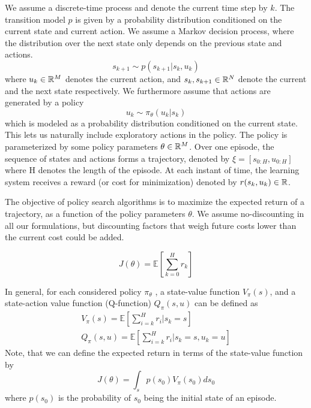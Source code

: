 We assume a discrete-time process and denote the
current time step by $k$. The transition model $p$ is given by a probability distribution conditioned on the current state and current action. We assume a Markov decision process, where the distribution over the next state only depends on the previous state and actions.
\begin{equation}
    s_{k+1} \sim p(s_{k+1}|s_k,u_k)
\end{equation}
where $u_k \in \mathbb R^M$ denotes the current action, and $s_k, s_{k+1} \in \mathbb R^N$
denote the current and the next state respectively. We furthermore
assume that actions are generated by a policy
\begin{equation}
    u_k \sim \pi_{\theta}(u_k|s_k)
\end{equation}
which is modeled as a probability distribution conditioned on the current state. This lets us naturally include exploratory actions in the policy. The policy is parameterized by some policy parameters $\theta \in \mathbb R^M$. Over one episode, the sequence of states and actions forms a trajectory, denoted by $\xi = [s_{0:H}, u_{0:H}]$ where H
denotes the length of the episode. At each instant of time,
the learning system receives a reward (or cost for minimization) denoted by $r(s_k, u_k) \in \mathbb R$.

The objective of policy search algorithms is to maximize the expected return of a trajectory, as a function of the policy parameters $\theta$. We assume no-discounting in all our formulations, but discounting factors that weigh future costs lower than the current cost could be added.

\begin{equation}
    J(\theta) = \mathds{E}[\sum_{k=0}^H r_k]
\end{equation}

In general, for each considered policy $\pi_{\theta}$ , a
state-value function $V_\pi(s)$, and a state-action value function (Q-function) $Q_\pi(s,u)$ can be defined as
\begin{align}
    V_\pi(s) = \mathds{E}[\sum_{i=k}^H r_i | s_k = s] \\
    Q_\pi(s, u) = \mathds{E}[\sum_{i=k}^H r_i | s_k = s, u_k = u]
\end{align}
Note, that we can define the expected return in terms of the state-value
function by
\begin{equation}
    J(\theta) = \int_s p(s_0)V_\pi(s_0) ds_0
\end{equation}
where $p(s_0)$ is the probability of $s_0$ being the initial state of an episode.

